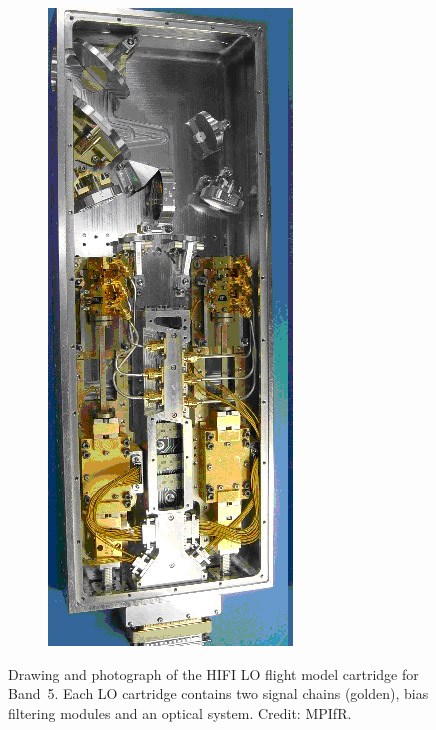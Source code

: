 \begin{figure}
\begin{subfigure}[c]{.22\textwidth}
        \includegraphics[width=\textwidth]{lou_band_5}%
    \end{subfigure}%
    \caption{
        Drawing and photograph of the HIFI LO flight model cartridge for Band~5.
        Each LO cartridge contains two signal chains (golden),
        bias filtering modules and an optical system.
        Credit: MPIfR.
    }
    \label{fig:photo_hifi_lou}
\end{figure}



